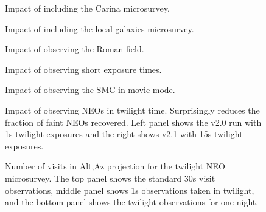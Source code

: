 \begin{figure}
\caption{Impact of including the Carina microsurvey.  \label{fig:carina}}
\end{figure}


\begin{figure}
\caption{Impact of including the local galaxies microsurvey. \label{fig:local_gals}}
\end{figure}

\begin{figure}
\caption{Impact of observing the Roman field.  \label{fig:roman}}
\end{figure}


\begin{figure}
\caption{Impact of observing short exposure times.  \label{fig:short_exp}}
\end{figure}

\begin{figure}
\caption{Impact of observing the SMC in movie mode.  \label{fig:smc}}
\end{figure}


\begin{figure}
\caption{Impact of observing NEOs in twilight time. Surprisingly reduces the fraction of faint NEOs recovered. Left panel shows the v2.0 run with 1s twilight exposures and the right shows v2.1 with 15s twilight exposures. \label{fig:twilight}}
\end{figure}

\begin{figure}
\caption{Number of visits in Alt,Az projection for the twilight NEO microsurvey. The top panel shows the standard 30s visit observations, middle panel shows 1s observations taken in twilight, and the bottom panel shows the twilight observations for one night. \label{fig:twi_maps}}
\end{figure}



